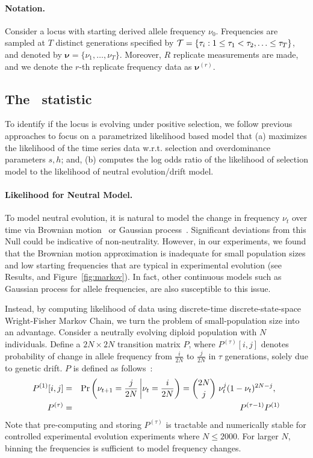 \documentclass[11pt]{article}
\def\comale{\text{{\sc Comale}}}
\begin{document}
\paragraph{Notation.} 
Consider a locus with starting derived allele frequency
$\nu_0$. Frequencies are sampled at $T$ distinct generations specified
by ${\cal T}= \{\tau_i: 1\le \tau_1<\tau_2,\ldots\le \tau_T\}$, and
denoted by $\bm{\nu}=\{\nu_1,\ldots,\nu_T\}$. Moreover, $R$ replicate
measurements are made, and we denote the $r$-th replicate frequency
data as $\bm{\nu}^{(r)}$.

\subsection{The \comale\  statistic}
To identify if the locus is evolving under positive selection, we
follow previous approaches to focus on a parametrized likelihood based
model that (a) maximizes the likelihood of the time series data
w.r.t. selection and overdominance parameters $s,h$; and, (b) computes
the log odds ratio of the likelihood of selection model to the
likelihood of neutral evolution/drift model.

\paragraph{Likelihood for Neutral Model.}
To model neutral evolution, it is natural to model the change in
frequency $\nu_t$ over time via Brownian
motion~\cite{feder2014Identifying} or Gaussian
process~\cite{Terhorst2015Multi}. Significant deviations from this
Null could be indicative of non-neutrality. However, in our
experiments, we found that the Brownian motion approximation is
inadequate for small population sizes and low starting frequencies
that are typical in experimental evolution (see Results, and
Figure~\ref{fig:markov}). In fact, other continuous models such as
Gaussian process for allele frequencies, are also susceptible to this
issue.

Instead, by computing likelihood of data using discrete-time
discrete-state-space Wright-Fisher Markov Chain, we turn the problem
of small-population size into an advantage. Consider a neutrally
evolving diploid population with $N$ individuals. Define a
$2N\times2N$ transition matrix $P$, where $P^{(\tau)}[i,j]$ denotes
probability of change in allele frequency from $\frac{i}{2N}$ to
$\frac{j}{2N}$ in $\tau$ generations, solely due to genetic drift. $P$
is defined as follows~\cite{Ewens2012Mathematical}:
\begin{eqnarray}
  P^{(1)}[i,j] &=& \operatorname{Pr}\left(\nu_{t+1}=\frac{j}{2N} \left|
      \nu_{t}=\frac{i}{2N}\right)={2N \choose j} \right.  \nu_{t}^j
  (1-\nu_{t})^{2N-j}, \;\;\label{eq:P1}\\
  P^{(\tau)} &=&   P^{(\tau-1)}P^{(1)} \label{eq:Pt}
\end{eqnarray}
Note that pre-computing and storing $P^{(\tau)}$ is tractable and
numerically stable for controlled experimental evolution experiments
where $N\le2000$. For larger $N$, binning the frequencies is
sufficient to model frequency changes.
\end{document}
